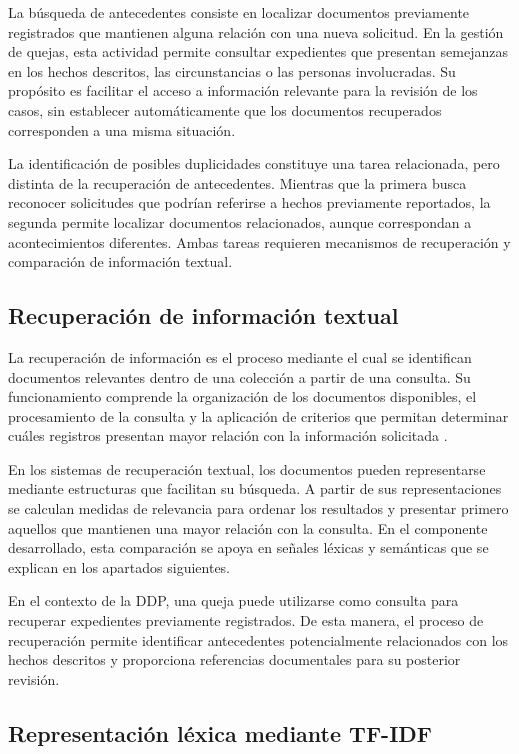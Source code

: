 La búsqueda de antecedentes consiste en localizar documentos previamente registrados que mantienen alguna relación con una nueva solicitud. En la gestión de quejas, esta actividad permite consultar expedientes que presentan semejanzas en los hechos descritos, las circunstancias o las personas involucradas. Su propósito es facilitar el acceso a información relevante para la revisión de los casos, sin establecer automáticamente que los documentos recuperados corresponden a una misma situación.

La identificación de posibles duplicidades constituye una tarea relacionada, pero distinta de la recuperación de antecedentes. Mientras que la primera busca reconocer solicitudes que podrían referirse a hechos previamente reportados, la segunda permite localizar documentos relacionados, aunque correspondan a acontecimientos diferentes. Ambas tareas requieren mecanismos de recuperación y comparación de información textual.

\subsection{Recuperación de información textual}

La recuperación de información es el proceso mediante el cual se identifican documentos relevantes dentro de una colección a partir de una consulta. Su funcionamiento comprende la organización de los documentos disponibles, el procesamiento de la consulta y la aplicación de criterios que permitan determinar cuáles registros presentan mayor relación con la información solicitada \cite{manning2008ir}.

En los sistemas de recuperación textual, los documentos pueden representarse mediante estructuras que facilitan su búsqueda. A partir de sus representaciones se calculan medidas de relevancia para ordenar los resultados y presentar primero aquellos que mantienen una mayor relación con la consulta. En el componente desarrollado, esta comparación se apoya en señales léxicas y semánticas que se explican en los apartados siguientes.

En el contexto de la DDP, una queja puede utilizarse como consulta para recuperar expedientes previamente registrados. De esta manera, el proceso de recuperación permite identificar antecedentes potencialmente relacionados con los hechos descritos y proporciona referencias documentales para su posterior revisión.

\subsection{Representación léxica mediante TF-IDF}

